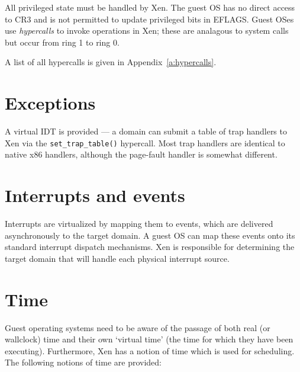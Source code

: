 \documentclass[11pt,twoside,final,openright]{xenstyle}
\begin{document}
All privileged state must be handled by Xen.  The guest OS has no
direct access to CR3 and is not permitted to update privileged bits in
EFLAGS. Guest OSes use \emph{hypercalls} to invoke operations in Xen; 
these are analagous to system calls but occur from ring 1 to ring 0. 

A list of all hypercalls is given in Appendix~\ref{a:hypercalls}. 



\section{Exceptions}

A virtual IDT is provided --- a domain can submit a table of trap
handlers to Xen via the {\tt set\_trap\_table()} hypercall.  Most trap
handlers are identical to native x86 handlers, although the page-fault
handler is somewhat different.


\section{Interrupts and events}

Interrupts are virtualized by mapping them to events, which are
delivered asynchronously to the target domain.  A guest OS can map
these events onto its standard interrupt dispatch mechanisms.  Xen 
is responsible for determining the target domain that will handle 
each physical interrupt source. 


\section{Time}

Guest operating systems need to be aware of the passage of both real
(or wallclock) time and their own `virtual time' (the time for
which they have been executing). Furthermore, Xen has a notion of 
time which is used for scheduling. The following notions of 
time are provided: 
\end{document}
